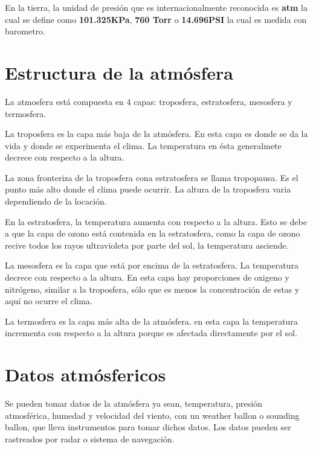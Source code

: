 \documentclass[11pt]{report}
\begin{document}
En la tierra, la unidad de presión que es internacionalmente reconocida es \textbf{atm} la cual se define como \textbf{101.325KPa}, \textbf{760 Torr} o \textbf{14.696PSI} la cual es medida con barometro.

\section*{Estructura de la atmósfera}
La atmosfera está compuesta en 4 capas: troposfera, estratosfera, mesosfera y termosfera.



La troposfera es la capa más baja de la atmósfera. En esta capa es donde se da la vida y donde se experimenta el clima. La temperatura en ésta generalmete decrece con respecto a la altura.

La zona fronteriza de la troposfera cona estratosfera se llama tropopausa. Es el punto más alto donde el clima puede ocurrir. La altura de la troposfera varia dependiendo de la locación.

En la estratosfera, la temperatura aumenta con respecto a la altura. Esto se debe a que la capa de ozono está contenida en la estratosfera, como la capa de ozono recive todos los rayos ultravioleta por parte del sol, la temperatura asciende.

La mesosfera es la capa que está por encima de la estratosfera. La temperatura decrece con respecto a la altura. En esta capa hay proporciones de oxigeno y nitrógeno, similar a la troposfera, sólo que es menos la concentración de estas y aquí no ocurre el clima.

La termosfera es la capa más alta de la atmósfera. en esta capa la temperatura incrementa con respecto a la altura porque es afectada directamente por el sol.

\section*{Datos atmósfericos}
Se pueden tomar datos de la atmósfera ya sean, temperatura, presión atmosférica, humedad y velocidad del viento, con un weather ballon o sounding ballon, que lleva instrumentos para tomar dichos datos. Los datos pueden ser rastreados por radar o sistema de navegación.
 
\end{document}
